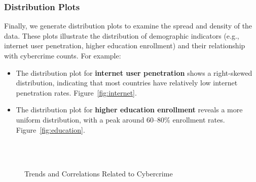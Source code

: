     \subsubsection{Distribution Plots} %
        Finally, we generate distribution plots to examine the spread and density of the data.
        These plots illustrate the distribution of demographic indicators
        (e.g., internet user penetration, higher education enrollment) and their relationship with cybercrime counts.
        For example:
        \begin{itemize}
            \item The distribution plot for \textbf{internet user penetration} shows a right-skewed distribution,
                indicating that most countries have relatively low internet penetration rates.
                Figure~\ref{fig:internet}.
            \item The distribution plot for \textbf{higher education enrollment} reveals a more uniform distribution,
                with a peak around 60--80\% enrollment rates.
                Figure~\ref{fig:education}.
        \end{itemize}
        \begin{figure}[htbp]
            \centering
            \\
            \\
            \caption{Trends and Correlations Related to Cybercrime}
        \end{figure}


